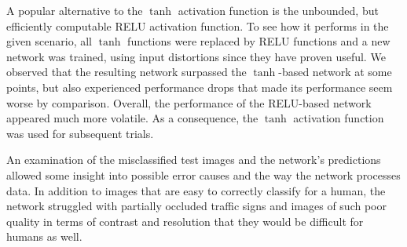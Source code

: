 \documentclass[11pt, a4paper]{article}
\begin{document}
A popular alternative to the $\tanh$ activation function is the unbounded, but efficiently computable RELU activation function. To see how it performs in the given scenario, all $\tanh$ functions were replaced by RELU functions and a new network was trained, using input distortions since they have proven useful. We observed that the resulting network surpassed the $\tanh$-based network at some points, but also experienced performance drops that made its performance seem worse by comparison. Overall, the performance of the RELU-based network appeared much more volatile. As a consequence, the $\tanh$ activation function was used for subsequent trials.

An examination of the misclassified test images and the network's predictions allowed some insight into possible error causes and the way the network processes data. In addition to images that are easy to correctly classify for a human, the network struggled with partially occluded traffic signs and images of such poor quality in terms of contrast and resolution that they would be difficult for humans as well.
\end{document}
